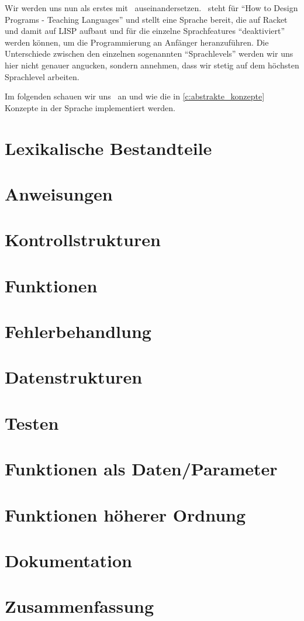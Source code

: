 Wir werden uns nun als erstes mit \racket\, auseinandersetzen. \racket\, steht für \enquote{How to Design Programs - Teaching Languages} und stellt eine Sprache bereit, die auf Racket und damit auf LISP aufbaut und für die einzelne Sprachfeatures \enquote{deaktiviert} werden können, um die Programmierung an Anfänger heranzuführen. Die Unterschiede zwischen den einzelnen sogenannten \enquote{Sprachlevels} werden wir uns hier nicht genauer angucken, sondern annehmen, dass wir stetig auf dem höchsten Sprachlevel arbeiten.

Im folgenden schauen wir uns \racket\, an und wie die in \ref{c:abstrakte_konzepte} Konzepte in der Sprache implementiert werden.

\section{Lexikalische Bestandteile}
	

\section{Anweisungen}
	

\section{Kontrollstrukturen}
	

\section{Funktionen}
	

\section{Fehlerbehandlung}
	

\section{Datenstrukturen}
	

\section{Testen}
	

\section{Funktionen als Daten/Parameter}
	

\section{Funktionen höherer Ordnung}
	

\section{Dokumentation}
	

\section{Zusammenfassung}
	
